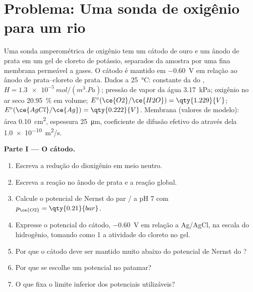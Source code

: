 \section{Problema: Uma sonda de oxigênio para um rio}

\begin{problem}
\label{pb:b2:current-potential-curves:1}
Uma sonda amperométrica de oxigênio tem um cátodo de ouro e um ânodo de prata
em um gel de cloreto de potássio, separados da amostra por uma fina membrana
permeável a gases. O cátodo é mantido em \qty{-0.60}{V} em relação ao ânodo de
prata--cloreto de prata. Dados a \qty{25}{\degreeCelsius}: constante da  do , $H = \qty{1.3e-5}{mol/(m^3.Pa)}$; pressão de vapor da água
\qty{3.17}{kPa}; oxigênio no ar seco 20.95~\% em volume; $E^\circ(\ce{O2}/\ce{H2O}) =
\qty{1.229}{V}$; $E^\circ(\ce{AgCl}/\ce{Ag}) = \qty{0.222}{V}$. Membrana (valores
de modelo): área \qty{0.10}{cm^2}, espessura \qty{25}{\micro m}, coeficiente de
difusão efetivo do  através dela \qty{1.0e-10}{m^2/s}.

\medskip
\noindent\textbf{Parte I --- O cátodo.}
\begin{enumerate}
  \item Escreva a redução do dioxigênio em meio neutro.
  \item Escreva a reação no ânodo de prata e a reação global.
  \item Calcule o potencial de Nernst do par / a pH 7 com
        $p_{\ce{O2}} = \qty{0.21}{bar}$.
  \item Expresse o potencial do cátodo, \qty{-0.60}{V} em relação a Ag/AgCl,
        na escala do hidrogênio, tomando como 1 a atividade do cloreto no gel.
  \item Por que o cátodo deve ser mantido muito abaixo do potencial de Nernst
        do ?
  \item Por que se escolhe um potencial no patamar?
  \item O que fixa o limite inferior dos potenciais utilizáveis?
\end{enumerate}


\end{problem}
